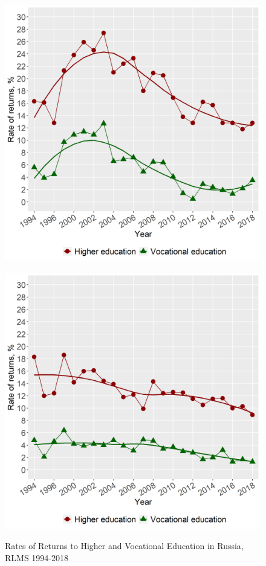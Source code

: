 \documentclass[alpha-refs]{wiley-article-01g}
\begin{document}
\begin{figure}[htbp!]
  \begin{minipage}[b]{.5\linewidth}
     \centering
     \includegraphics[width=\textwidth]{re_HE_f.png}
     \label{fig:1.4a}
  \end{minipage}
  \hfill
  \begin{minipage}[b]{.5\linewidth}
     \centering
     \includegraphics[width=\textwidth]{re_HE_m.png}
     \label{fig:1.4b}
  \end{minipage}
  \caption{Rates of Returns to Higher and Vocational Education in Russia, RLMS 1994-2018}\label{fig:1.4}
\end{figure}
\end{document}
